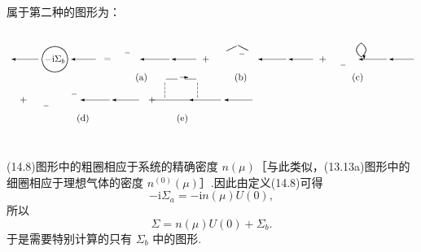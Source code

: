 属于第二种的图形为：
\begin{equation}
  \setlength{\unitlength}{0.62pt}%
  \begin{picture}(700,205)(0,0)
    \arrL{54}{150}{46}%
    \qbezier(82,128)(102.108,129.892)(104,150)%
    \qbezier(104,150)(102.108,170.108)(82,172)%
    \qbezier(82,172)(61.892,170.108)(60,150)%
    \qbezier(60,150)(61.892,129.892)(82,128)%
    \put(82,150){\makebox(0,0){$-\mathrm{i}\Sigma_b$}}%
    \arrL{152}{150}{42}%
    \put(172,150){\makebox(0,0){$=$}}%
    \put(190,150){\line(1,1){9}}%
    \put(202,161){\line(1,0){8}}%
    \put(214,160){\line(1,-1){9}}%
    \arrL{278}{150}{50}%
    \arrL{324}{150}{42}%
    \put(230,118){\makebox(0,0){(a)}}%
    \put(340,150){\makebox(0,0){$+$}}%
    \put(360,150){\line(1,1){13}}%
    \put(375,164){\line(2,1){18}}%
    \put(395,174){\line(2,-1){18}}%
    \put(415,164){\line(1,-1){13}}%
    \put(388,150){\line(1,1){8}}%
    \put(398,159){\line(1,0){8}}%
    \put(408,158){\line(1,-1){8}}%
    \arrL{478}{150}{48}%
    \arrL{524}{150}{42}%
    \put(400,118){\makebox(0,0){(b)}}%
    \put(540,150){\makebox(0,0){$+$}}%
    \put(560,150){\line(1,-1){9}}%
    \put(571,140){\line(1,0){8}}%
    \put(581,141){\line(1,1){9}}%
    \qbezier(606,154)(622,166)(606,178)%
    \qbezier(606,154)(590,166)(606,178)%
    \put(611,158){\vector(0,-1){8}}%
    \arrL{650}{150}{48}%
    \arrL{696}{150}{42}%
    \put(600,118){\makebox(0,0){(c)}}%
    \put(28,80){\makebox(0,0){$+$}}%
    \put(52,80){\line(1,-1){9}}%
    \put(63,70){\line(1,0){8}}%
    \put(73,71){\line(1,1){9}}%
    \put(100,80){\line(1,1){9}}%
    \put(111,90){\line(1,0){8}}%
    \put(121,89){\line(1,-1){9}}%
    \arrL{176}{80}{50}%
    \arrL{226}{80}{46}%
    \put(130,48){\makebox(0,0){(d)}}%
    \put(248,80){\makebox(0,0){$+$}}%
    \put(312,80){\line(-1,0){66}}%
    \arrL{366}{80}{54}%
    \arrL{420}{80}{48}%
    \dvh{270}{84}{4}%
    \dvh{326}{84}{4}%
    \put(272,116){\line(1,0){20}}%
    \put(304,116){\line(1,0){20}}%
    \put(296,119){\vector(1,0){14}}%
    \put(300,48){\makebox(0,0){(e)}}%
  \end{picture}
\end{equation}
(14.8)图形中的粗圈相应于系统的精确密度 $n(\mu)$［与此类似，(13.13a)图形中的细圈相应于理想气体的密度 $n^{(0)}(\mu)$］.因此由定义(14.8)可得
\begin{equation}
  -\mathrm{i}\Sigma_a=-\mathrm{i}n(\mu)U(0),
\end{equation}
所以
\begin{equation}
  \Sigma=n(\mu)U(0)+\Sigma_b.
\end{equation}
于是需要特别计算的只有 $\Sigma_b$ 中的图形.

